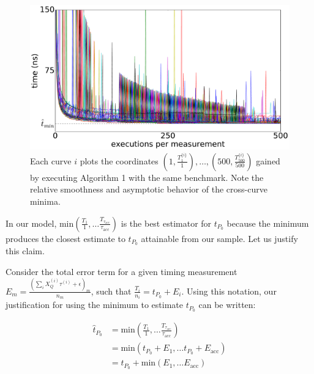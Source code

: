 \documentclass[conference]{IEEEtran}
\begin{document}
\begin{figure}
\centering
\includegraphics[width=\columnwidth]{figures/fig2/linear_scan_branchsum}
\caption{Each curve $i$ plots the coordinates
$\left(1, \frac{T^{\{i\}}_1}{1}\right), \dots,
\left(500, \frac{T^{\{i\}}_{500}}{500}\right)$
gained by executing Algorithm 1 with the same benchmark. Note the relative
smoothness and asymptotic behavior of the cross-curve minima.}
\label{fig:scaling}
\end{figure}

In our model, $\textrm{min}(\frac{T_1}{1}, \dots
\frac{T_{\tau_{\textrm{acc}}}}{\tau_{\textrm{acc}}})$ is the best estimator for $t_{P_0}$
because the minimum produces the closest estimate to $t_{P_0}$ attainable from our sample.
Let us justify this claim.

Consider the total error term for a given timing measurement $E_m = \frac{\left(\sum_{i}
X_Q^{(i)} \tau^{(i)} + \epsilon \right)_m}{n_m}$, such that $\frac{T_i}{n_i} = t_{P_0} +
E_i$. Using this notation, our justification for using the minimum to estimate $t_{P_0}$ can
be written:

\begin{align}
    \hat{t}_{P_0} &= \textrm{min}(\frac{T_1}{1}, \dots \frac{T_{\tau_{\textrm{acc}}}}{\tau_{\textrm{acc}}}) \\ \nonumber
                  &= \textrm{min}(t_{P_0} + E_1, \dots t_{P_0} + E_{\textrm{acc}}) \\ \nonumber
                  &= t_{P_0} + \textrm{min}(E_1, \dots E_{\textrm{acc}}) \\ \nonumber
\end{align}
\end{document}
